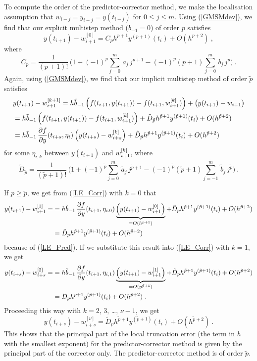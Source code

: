 To compute the order of the predictor-corrector method,
we make the localisation assumption that
$w_{i-j} = y_{i-j} = y(t_{i-j})$ for $0\leq j \leq m$.
Using (\ref{GMSMdev}), we find that our explicit multistep method
($b_{-1} =0$) of order $p$ satisfies
\begin{equation} \label{LE_Pred}
y(t_{i+1}) - w_{i+1}^{[0]} = C_p h^{p+1} y^{(p+1)}(t_i) + O(h^{p+2})
\ ,
\end{equation}
where
\[
C_p = \frac{1}{(p+1)!}\,\bigg( 1 + (-1)^p \sum_{j=0}^m\,a_j\,j^{p+1}
- (-1)^p (p+1) \sum_{j=0}^m\,b_j\, j^p\bigg) \ .
\]
Again, using (\ref{GMSMdev}), we find that our implicit multistep
method of order $\tilde{p}$ satisfies
\begin{align}
&y(t_{i+1}) - w_{i+1}^{[k+1]}
= h \tilde{b}_{-1} \left( f(t_{i+1},y(t_{i+1})) - f(t_{i+1},w_{i+1}^{[k]}) \right)
+ \big( y(t_{i+1}) - w_{i+1} \big) \nonumber \\
&=h \tilde{b}_{-1} \left( f(t_{i+1},y(t_{i+1})) - f(t_{i+1},w_{i+1}^{[k]}) \right)
+ \tilde{D}_{\tilde{p}} h^{\tilde{p}+1} y^{(\tilde{p}+1)}(t_i) +
O(h^{\tilde{p}+2}) \nonumber \\
&= h \tilde{b}_{-1} \,\frac{\partial{f}}{\partial{y}}(t_{i+s},\eta_i)
\left( y(t_{i+s}) - w_{i+s}^{[k]} \right)
+ \tilde{D}_{\tilde{p}} h^{\tilde{p}+1} y^{(\tilde{p}+1)}(t_i) + O(h^{\tilde{p}+2})
\label{LE_Corr}
\end{align}
for some $\eta_{i,k}$ between $y(t_{i+1})$ and
$\displaystyle w_{i+1}^{[k]}$, where
\[
\tilde{D}_{\tilde{p}} = \frac{1}{(\tilde{p}+1)!}\,\bigg( 1
+ (-1)^{\tilde{p}} \sum_{j=0}^{\tilde{m}}\,\tilde{a}_j\,j^{\tilde{p}+1}
- (-1)^{\tilde{p}} (\tilde{p}+1) \sum_{j=-1}^{\tilde{m}}\,\tilde{b}_j\,
j^{\tilde{p}}\bigg) \ .
\]

If $p \geq \tilde{p}$, we get from (\ref{LE_Corr}) with $k=0$ that
\begin{align*}
y(t_{i+1}) - w_{i+1}^{[1]} =
&= h \tilde{b}_{-1} \,\frac{\partial{f}}{\partial{y}}(t_{i+1},\eta_{i.0})
\underbrace{\left( y(t_{i+1}) - w_{i+1}^{[0]} \right)}_{=O(h^{p+1})}
+ \tilde{D}_p h^{\tilde{p}+1} y^{(\tilde{p}+1)}(t_i) +
O(h^{\tilde{p}+2}) \\
&= \tilde{D}_p h^{\tilde{p}+1} y^{(\tilde{p}+1)}(t_i) +
O(h^{\tilde{p}+2})
\end{align*}
because of (\ref{LE_Pred}).  If we substitute this result into
(\ref{LE_Corr}) with $k=1$, we get
\begin{align*}
y(t_{i+s}) - w_{i+s}^{[2]} =
&= h \tilde{b}_{-1} \,\frac{\partial{f}}{\partial{y}}(t_{i+1},\eta_{i,1})
\underbrace{\left( y(t_{i+1}) - w_{i+1}^{[1]} \right)}_{=O(y^{\tilde{p}+1})}
+ \tilde{D}_p h^{\tilde{p}+1} y^{(\tilde{p}+1)}(t_i) +
O(h^{\tilde{p}+2}) \\
&= \tilde{D}_p h^{\tilde{p}+1} y^{(\tilde{p}+1)}(t_i) +
O(h^{\tilde{p}+2}) \ .
\end{align*}
Proceeding this way with $k=2$, $3$, \ldots, $\nu-1$, we get
\[
y(t_{i+s}) - w_{i+s}^{[\nu]}
= \tilde{D}_p h^{\tilde{p}+1} y^{(\tilde{p}+1)}(t_i) +
O(h^{\tilde{p}+2}) \ .
\]
This shows that the principal part of the local truncation error (the
term in $h$ with the smallest exponent) for the predictor-corrector
method is given by the principal part of the corrector only.  The 
predictor-corrector method is of order $\tilde{p}$.

